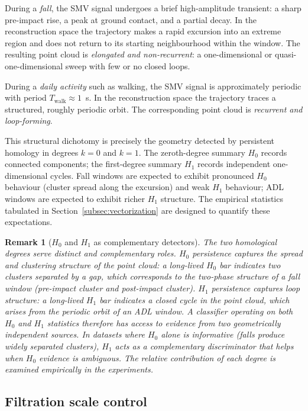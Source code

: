 \documentclass[onluarkali,ingilizce,yukseklisans,karton,LisansustuEgitim]{itutez}
\newtheorem{remark}{Remark}[chapter]
\providecommand{\1}{\mathbf{1}}
\begin{document}
During a \emph{fall}, the SMV signal undergoes a brief high-amplitude transient: a sharp pre-impact rise, a peak at ground contact, and a partial decay. In the reconstruction space the trajectory makes a rapid excursion into an extreme region and does not return to its starting neighbourhood within the window. The resulting point cloud is \emph{elongated and non-recurrent}: a one-dimensional or quasi-one-dimensional sweep with few or no closed loops.

During a \emph{daily activity} such as walking, the SMV signal is approximately periodic with period $T_{\mathrm{walk}}\approx 1$~s. In the reconstruction space the trajectory traces a structured, roughly periodic orbit. The corresponding point cloud is \emph{recurrent and loop-forming}.

This structural dichotomy is precisely the geometry detected by persistent homology in degrees $k=0$ and $k=1$. The zeroth-degree summary $H_0$ records connected components; the first-degree summary $H_1$ records independent one-dimensional cycles. Fall windows are expected to exhibit pronounced $H_0$ behaviour (cluster spread along the excursion) and weak $H_1$ behaviour; ADL windows are expected to exhibit richer $H_1$ structure. The empirical statistics tabulated in Section~\ref{subsec:vectorization} are designed to quantify these expectations.

\begin{remark}[$H_0$ and $H_1$ as complementary detectors]
\label{rem:h0-h1-complementary}
The two homological degrees serve distinct and complementary roles. $H_0$ persistence captures the \emph{spread} and \emph{clustering structure} of the point cloud: a long-lived $H_0$ bar indicates two clusters separated by a gap, which corresponds to the two-phase structure of a fall window (pre-impact cluster and post-impact cluster). $H_1$ persistence captures \emph{loop structure}: a long-lived $H_1$ bar indicates a closed cycle in the point cloud, which arises from the periodic orbit of an ADL window. A classifier operating on both $H_0$ and $H_1$ statistics therefore has access to evidence from two geometrically independent sources. In datasets where $H_0$ alone is informative (falls produce widely separated clusters), $H_1$ acts as a complementary discriminator that helps when $H_0$ evidence is ambiguous. The relative contribution of each degree is examined empirically in the experiments.
\end{remark}

\subsection{Filtration scale control}
\label{subsubsec:eps}
\end{document}
